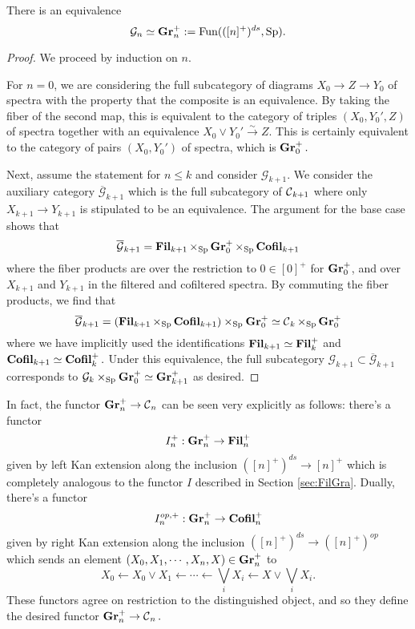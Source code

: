\begin{lem}
There is an equivalence $$\mathcal{G}_n \simeq \operatorname{\mathbf{Gr}}_n^+ := \operatorname{\text{Fun}}(([n]^{+})^{ds}, \operatorname{\mathrm{Sp}}).$$
\end{lem}
\begin{proof}
We proceed by induction on $n$.  

For $n=0$, we are considering the full subcategory of diagrams $X_0 \to Z \to Y_0$ of spectra with the property that the composite is an equivalence.  By taking the fiber of the second map, this is equivalent to the category of triples $(X_0, Y_0',Z)$ of spectra together with an equivalence $X_0 \vee Y_0' \xrightarrow{\sim} Z.$   This is  certainly equivalent to the category of pairs $(X_0, Y_0')$ of spectra, which is $\operatorname{\mathbf{Gr}}_0^+.$  

Next, assume the statement for $n\leq k$ and consider $\mathcal{G}_{k+1}.$  We consider the auxiliary category $\overline{\mathcal{G}}_{k+1}$ which is the full subcategory of $\operatorname{\mathcal{C}}_{k+1}$ where only $X_{k+1} \to Y_{k+1}$ is stipulated to be an equivalence.    The argument for the base case shows that $$\overline{\mathcal{G}}_{k+1} = \operatorname{\mathbf{Fil}}_{k+1} \times_{\operatorname{\mathrm{Sp}}} \operatorname{\mathbf{Gr}}_0^+ \times_{\operatorname{\mathrm{Sp}}} \operatorname{\mathbf{Cofil}}_{k+1}$$ where the fiber products are over the restriction to $0\in [0]^+$ for $\operatorname{\mathbf{Gr}}_0^+$, and over $X_{k+1}$ and $Y_{k+1}$ in the filtered and cofiltered spectra.  By commuting the fiber products, we find that $$\overline{\mathcal{G}}_{k+1} = (\operatorname{\mathbf{Fil}}_{k+1} \times_{\operatorname{\mathrm{Sp}}} \operatorname{\mathbf{Cofil}}_{k+1}) \times_{\operatorname{\mathrm{Sp}}} \operatorname{\mathbf{Gr}}_0^+  \simeq \operatorname{\mathcal{C}}_k \times_{\operatorname{\mathrm{Sp}}} \operatorname{\mathbf{Gr}}_0^+$$ where we have implicitly used the identifications $\operatorname{\mathbf{Fil}}_{k+1} \simeq \operatorname{\mathbf{Fil}}_k^+$ and $\operatorname{\mathbf{Cofil}}_{k+1} \simeq \operatorname{\mathbf{Cofil}}_k^+.$   Under this equivalence, the full subcategory $\mathcal{G}_{k+1} \subset \overline{\mathcal{G}}_{k+1}$ corresponds to $\mathcal{G}_k \times_{\operatorname{\mathrm{Sp}}} \operatorname{\mathbf{Gr}}_0^+ \simeq \operatorname{\mathbf{Gr}}_{k+1}^+$ as desired.  

\end{proof}



In fact, the functor $\operatorname{\mathbf{Gr}}_n^+ \to \operatorname{\mathcal{C}}_n$ can be seen very explicitly as follows: there's a functor $$I_n^+: \operatorname{\mathbf{Gr}}_n^+ \to \operatorname{\mathbf{Fil}}_n^+$$ given by left Kan extension along the inclusion $([n]^+)^{ds} \to [n]^+$ which is completely analogous to the functor $I$ described in Section \ref{sec:FilGra}.  Dually, there's a functor $$I_n^{op,+}:\operatorname{\mathbf{Gr}}_n^+ \to \operatorname{\mathbf{Cofil}}_n^+$$ given by right Kan extension along the inclusion $([n]^+)^{ds} \to ([n]^+)^{op}$ which sends an element $(X_0, X_1, \cdots, X_n, X)\in \operatorname{\mathbf{Gr}}_n^+$ to $$X_0 \longleftarrow X_0\vee X_1 \longleftarrow \cdots \longleftarrow \bigvee_i X_i \longleftarrow X \vee \bigvee_i X_i.$$  These functors agree on restriction to the distinguished object, and so they define the desired functor $\operatorname{\mathbf{Gr}}_n^+ \to \operatorname{\mathcal{C}}_n.$  


